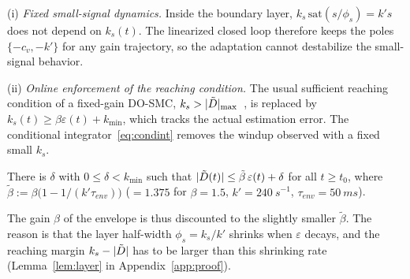 \noindent(i) \emph{Fixed small-signal dynamics.} Inside the boundary layer, $k_s\,\mathrm{sat}(s/\phi_s)=k's$ does not depend on $k_s(t)$. The linearized closed loop therefore keeps the poles $\{-c_v,-k'\}$ for any gain trajectory, so the adaptation cannot destabilize the small-signal behavior.

\noindent(ii) \emph{Online enforcement of the reaching condition.} The usual sufficient reaching condition of a fixed-gain DO-SMC, $k_s>|\tilde{D}|_{\max}$~\cite{utkin2009,shtessel2014}, is replaced by $k_s(t)\ge\beta\varepsilon(t)+k_{\min}$, which tracks the actual estimation error. The conditional integrator~\eqref{eq:condint} removes the windup observed with a fixed small $k_s$.

\begin{assumption}\label{as:est}
There is $\delta$ with $0\le\delta<k_{\min}$ such that $|\tilde{D}(t)|\le\tilde\beta\,\varepsilon(t)+\delta$ for all $t\ge t_0$, where $\tilde\beta:=\beta\big(1-1/(k'\tau_{env})\big)$ ($=1.375$ for $\beta=1.5$, $k'=\SI{240}{s^{-1}}$, $\tau_{env}=\SI{50}{ms}$).
\end{assumption}

The gain $\beta$ of the envelope is thus discounted to the slightly smaller $\tilde\beta$. The reason is that the layer half-width $\phi_s=k_s/k'$ shrinks when $\varepsilon$ decays, and the reaching margin $k_s-|\tilde{D}|$ has to be larger than this shrinking rate (Lemma~\ref{lem:layer} in Appendix~\ref{app:proof}).


